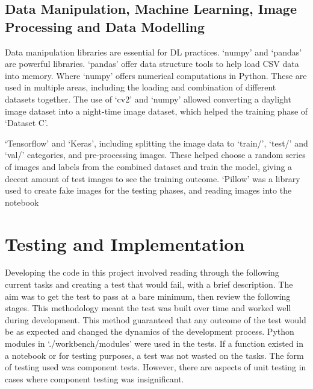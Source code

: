 \documentclass[12pt]{report} %
\begin{document}
		\subsection*{Data Manipulation, Machine Learning, Image Processing and Data Modelling}
			Data manipulation libraries are essential for DL practices. `numpy' and `pandas' are powerful libraries. `pandas' offer data structure tools to help load CSV data into memory. Where `numpy' offers numerical computations in Python. These are used in multiple areas, including the loading and combination of different datasets together. The use of `cv2' and `numpy' allowed converting a daylight image dataset into a night-time image dataset, which helped the training phase of `Dataset C'.

			`Tensorflow' and `Keras', including splitting the image data to `train/', `test/' and `val/' categories, and pre-processing images. These helped choose a random series of images and labels from the combined dataset and train the model, giving a decent amount of test images to see the training outcome. `Pillow' was a library used to create fake images for the testing phases, and reading images into the notebook
		
	\section{Testing and Implementation}
		Developing the code in this project involved reading through the following current tasks and creating a test that would fail, with a brief description. The aim was to get the test to pass at a bare minimum, then review the following stages. This methodology meant the test was built over time and worked well during development. This method guaranteed that any outcome of the test would be as expected and changed the dynamics of the development process. Python modules in `./workbench/modules' were used in the tests. If a function existed in a notebook or for testing purposes, a test was not wasted on the tasks. The form of testing used was component tests. However, there are aspects of unit testing in cases where component testing was insignificant.
\end{document}
